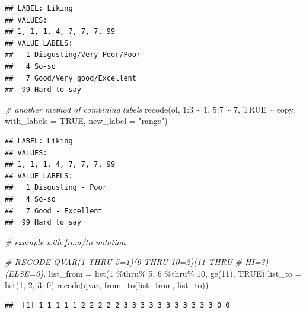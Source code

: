 \documentclass[
]{book}
\newenvironment{Shaded}{\begin{snugshade}}{\end{snugshade}}
\newcommand{\AttributeTok}[1]{\textcolor[rgb]{0.77,0.63,0.00}{#1}}
\newcommand{\CommentTok}[1]{\textcolor[rgb]{0.56,0.35,0.01}{\textit{#1}}}
\newcommand{\ConstantTok}[1]{\textcolor[rgb]{0.00,0.00,0.00}{#1}}
\newcommand{\DecValTok}[1]{\textcolor[rgb]{0.00,0.00,0.81}{#1}}
\newcommand{\FunctionTok}[1]{\textcolor[rgb]{0.00,0.00,0.00}{#1}}
\newcommand{\NormalTok}[1]{#1}
\newcommand{\OtherTok}[1]{\textcolor[rgb]{0.56,0.35,0.01}{#1}}
\newcommand{\SpecialCharTok}[1]{\textcolor[rgb]{0.00,0.00,0.00}{#1}}
\newcommand{\StringTok}[1]{\textcolor[rgb]{0.31,0.60,0.02}{#1}}
\begin{document}
\begin{verbatim}
## LABEL: Liking 
## VALUES:
## 1, 1, 1, 4, 7, 7, 7, 99
## VALUE LABELS:                             
##   1 Disgusting/Very Poor/Poor
##   4 So-so                    
##   7 Good/Very good/Excellent 
##  99 Hard to say
\end{verbatim}

\begin{Shaded}
\begin{Highlighting}[]
\CommentTok{\# another method of combining labels}
\FunctionTok{recode}\NormalTok{(ol, }\DecValTok{1}\SpecialCharTok{:}\DecValTok{3} \SpecialCharTok{\textasciitilde{}} \DecValTok{1}\NormalTok{, }\DecValTok{5}\SpecialCharTok{:}\DecValTok{7} \SpecialCharTok{\textasciitilde{}} \DecValTok{7}\NormalTok{, }\ConstantTok{TRUE} \SpecialCharTok{\textasciitilde{}}\NormalTok{ copy, }\AttributeTok{with\_labels =} \ConstantTok{TRUE}\NormalTok{, }
  \AttributeTok{new\_label =} \StringTok{"range"}\NormalTok{)}
\end{Highlighting}
\end{Shaded}

\begin{verbatim}
## LABEL: Liking 
## VALUES:
## 1, 1, 1, 4, 7, 7, 7, 99
## VALUE LABELS:                     
##   1 Disgusting - Poor
##   4 So-so            
##   7 Good - Excellent 
##  99 Hard to say
\end{verbatim}

\begin{Shaded}
\begin{Highlighting}[]
\CommentTok{\# example with from/to notation}

\CommentTok{\# RECODE QVAR(1 THRU 5=1)(6 THRU 10=2)(11 THRU}
\CommentTok{\# HI=3)(ELSE=0).}
\NormalTok{list\_from }\OtherTok{=} \FunctionTok{list}\NormalTok{(}\DecValTok{1} \SpecialCharTok{\%thru\%} \DecValTok{5}\NormalTok{, }\DecValTok{6} \SpecialCharTok{\%thru\%} \DecValTok{10}\NormalTok{, }\FunctionTok{ge}\NormalTok{(}\DecValTok{11}\NormalTok{), }\ConstantTok{TRUE}\NormalTok{)}
\NormalTok{list\_to }\OtherTok{=} \FunctionTok{list}\NormalTok{(}\DecValTok{1}\NormalTok{, }\DecValTok{2}\NormalTok{, }\DecValTok{3}\NormalTok{, }\DecValTok{0}\NormalTok{)}
\FunctionTok{recode}\NormalTok{(qvar, }\FunctionTok{from\_to}\NormalTok{(list\_from, list\_to))}
\end{Highlighting}
\end{Shaded}

\begin{verbatim}
##  [1] 1 1 1 1 1 2 2 2 2 2 3 3 3 3 3 3 3 3 3 3 3 0 0
\end{verbatim}
\end{document}
